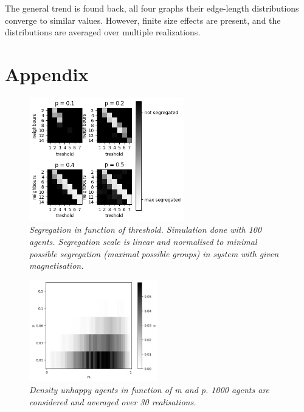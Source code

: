 The general trend is found back, all four graphs their edge-length distributions converge to similar values. However, finite size effects are present, and the distributions are averaged over multiple realizations.


\section{Appendix}
\begin{figure}[H]
\begin{center}
	\includegraphics[width=0.6\textwidth]{fig2.png}
	\caption{\emph{ Segregation in function of threshold. Simulation done with 100 agents. Segregation scale is linear and normalised to minimal possible segregation (maximal possible groups) in system with given magnetisation. }}
	\label{figuur2}
\end{center}
\end{figure}



\begin{figure}[H]
\begin{center}
	\includegraphics[width=0.5\textwidth]{fig1.png}
	\caption{\emph{ Density unhappy agents in function of m and p. 1000 agents are considered and averaged over 30 realisations. }}
	\label{figuur1}
\end{center}
\end{figure}



